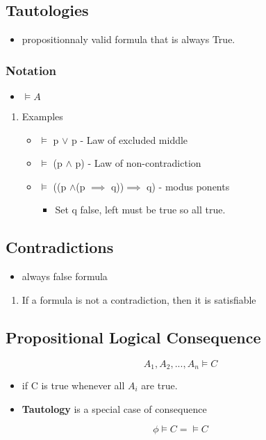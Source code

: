 \documentclass[11pt]{article}
\begin{document}
\subsection{Tautologies}
\label{sec:org8a0a8f8}
\begin{itemize}
\item propositionnaly valid formula that is always True.
\end{itemize}
\subsubsection{Notation}
\label{sec:org78f02d2}
\begin{itemize}
\item \(\models A\)
\end{itemize}
\begin{enumerate}
\item Examples
\label{sec:orgc2263e2}
\begin{itemize}
\item \(\models\) p \(\lor\) \textlnot{} p - Law of excluded middle
\item \(\models\) \textlnot{}(p \(\land\) \textlnot{} p) - Law of non-contradiction
\item \(\models\) ((p \(\land\)(p \(\implies\) q))\(\implies\) q) - modus ponents
\begin{itemize}
\item Set q false, left must be true so all true.
\end{itemize}
\end{itemize}
\end{enumerate}
\subsection{Contradictions}
\label{sec:orgfc8936a}
\begin{itemize}
\item always false formula
\end{itemize}
\begin{enumerate}
\item If a formula is not a contradiction, then it is satisfiable
\label{sec:orgc713418}
\end{enumerate}
\subsection{Propositional Logical Consequence}
\label{sec:org0236754}
$$A_1 , A_2 ,..., A_n \models C$$
\begin{itemize}
\item if C is true whenever all \(A_i\) are true.
\item \textbf{Tautology} is a special case of consequence
\end{itemize}
$$ \phi \models C = \models C$$
\end{document}
